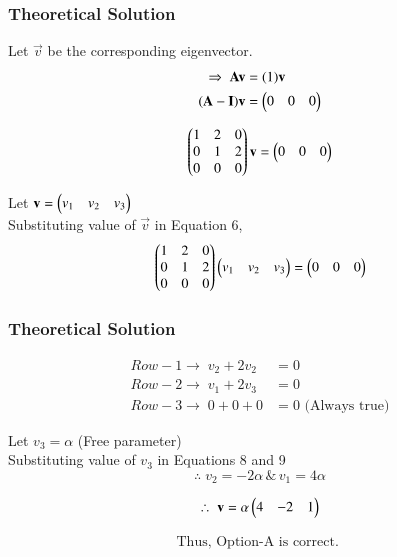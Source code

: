\documentclass{beamer}
\begin{document}
\begin{frame}[fragile]
    \frametitle{Theoretical Solution}
Let $\vec{v}$ be the corresponding eigenvector.
\begin{align}
    \Rightarrow \; \mathbf{A}\mathbf{v} &= (1)\mathbf{v} \\ 
    (\mathbf{A} - \mathbf{I})\mathbf{v} &= \begin{pmatrix}0 & 0 & 0\end{pmatrix}
\end{align}

\begin{equation}
\begin{pmatrix}1 & 2 & 0 \\ 0 & 1 & 2 \\ 0 & 0 & 0\end{pmatrix}\mathbf{v} = \begin{pmatrix}0 & 0 & 0\end{pmatrix}    
\end{equation}

Let $\mathbf{v} = \begin{pmatrix}v_1 & v_2 & v_3\end{pmatrix}$\\

Substituting value of $\vec{v}$ in Equation 6,
\begin{equation}
   \begin{pmatrix}1 & 2 & 0 \\ 0 & 1 & 2 \\ 0 & 0 & 0\end{pmatrix}\begin{pmatrix}v_1 & v_2 & v_3\end{pmatrix} = \begin{pmatrix}0 & 0 & 0\end{pmatrix} 
\end{equation}
\end{frame}

\begin{frame}[fragile]
    \frametitle{Theoretical Solution}
\begin{align}
    Row-1 \rightarrow \; v_2 + 2v_2 &= 0\\
    Row-2 \rightarrow \; v_1 + 2v_3 &= 0\\
    Row-3 \rightarrow \; 0 + 0 + 0 &= 0 \text{ (Always true)}
\end{align}

Let $v_3 = \alpha$ (Free parameter)\\
Substituting value of $v_3$ in Equations 8 and 9
\begin{equation}
\therefore \; v_2 = -2\alpha \, \&  \, v_1 = 4\alpha  
\end{equation}

\begin{equation}
    \therefore \; \mathbf{v} = \alpha \begin{pmatrix}4 & -2 & 1\end{pmatrix} 
\end{equation}

\begin{align*}
    \boxed{\text{Thus, Option-A is correct. }}
\end{align*}
\end{frame}
\end{document}
